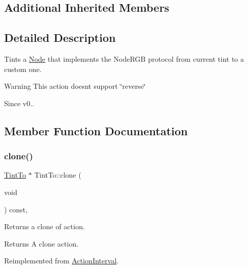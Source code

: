 \subsection*{Additional Inherited Members}


\subsection{Detailed Description}
Tints a \hyperlink{classNode}{Node} that implements the Node\+R\+GB protocol from current tint to a custom one. 

\begin{DoxyWarning}{Warning}
This action doesn\textquotesingle{}t support \char`\"{}reverse\char`\"{} 
\end{DoxyWarning}
\begin{DoxySince}{Since}
v0.. 
\end{DoxySince}


\subsection{Member Function Documentation}
\mbox{\label{classTintTo_ad34183f5018f8066b096017bbcfefd02}} 
\subsubsection{\texorpdfstring{clone()}{clone()}\hspace{0.1cm}{\footnotesize\ttfamily [1/2]}}
{\footnotesize\ttfamily \hyperlink{classTintTo}{Tint\+To} $\ast$ Tint\+To\+::clone (\begin{DoxyParamCaption}\item[{void}]{ }\end{DoxyParamCaption}) const\hspace{0.3cm}{\ttfamily [override]}, {\ttfamily [virtual]}}

Returns a clone of action.

\begin{DoxyReturn}{Returns}
A clone action. 
\end{DoxyReturn}


Reimplemented from \hyperlink{classActionInterval_abc93ce0c2f54a90eb216a7803f25f44a}{Action\+Interval}.

\mbox{\label{classTintTo_af52464ac1b16746af6fb510679e1cd90}} 

